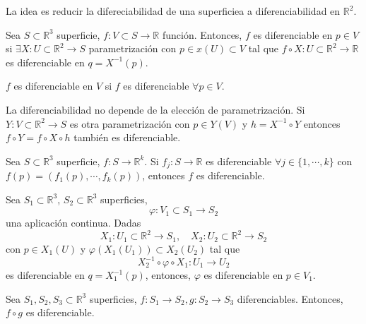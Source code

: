 \begin{note}
  La idea es reducir la difereciabilidad de una superficiea a diferenciabilidad en $\mathbb{R}^{2}$.
\end{note}

\begin{defn}
  Sea $S \subset \mathbb{R}^{3}$ superficie, $f: V \subset S \to \mathbb{R}$ función. Entonces, $f$ es diferenciable en $p \in V$ si $\exists X: U \subset \mathbb{R}^{2} \to S$ parametrización con $p \in x(U) \subset V$ tal que $f \circ X:  U \subset \mathbb{R}^{2} \to \mathbb{R}$ es diferenciable en $q = X^{-1}(p)$.
\end{defn}

\begin{obs}
  $f$ es diferenciable en $V$ si $f$ es diferenciable $\forall p \in V$.
\end{obs}

\begin{obs}
  La diferenciabilidad no depende de la elección de parametrización. Si $Y: V \subset \mathbb{R}^{2} \to S$ es otra parametrización con $p \in Y(V)$ y $h = X^{-1} \circ Y$ entonces $f \circ Y = f \circ X \circ h$ también es diferenciable.
\end{obs}

\begin{defn}
  Sea $S \subset \mathbb{R}^{3}$ superficie, $f: S \to \mathbb{R}^{k}$. Si $f_{j}: S \to \mathbb{R}$ es diferenciable $\forall j \in \{ 1, \cdots, k \}$ con $f(p) = ( f_{1}(p), \cdots , f_{k}(p) )$, entonces $f$ es diferenciable.
\end{defn}

\begin{defn}
  Sea $S_{1} \subset \mathbb{R}^{3}$, $S_{2} \subset \mathbb{R}^{3}$ superficies,
  \[
    \varphi: V_{1} \subset S_{1} \to S_{2}
  \]
  una aplicación continua. Dadas
  \[
    X_{1}: U_{1} \subset \mathbb{R}^{2} \to S_{1}, \quad X_{2}: U_{2} \subset \mathbb{R}^{2} \to S_{2}
  \]
  con $p \in X_{1}(U)$ y $\varphi(X_{1}(U_{1})) \subset X_{2}(U_{2})$ tal que
  \[
    X_{2}^{-1} \circ \varphi \circ X_{1} : U_{1} \to U_{2}
  \]
  es diferenciable en $q = X_{1}^{-1}(p)$, entonces, $\varphi$ es diferenciable en $p \in V_{1}$.
\end{defn}

\begin{prop}
  Sea $S_{1},S_{2},S_{3} \subset \mathbb{R}^{3}$ superficies, $f : S_{1} \to S_{2}, g : S_{2} \to S_{3}$ diferenciables. Entonces, $f \circ g$ es diferenciable.
\end{prop}

